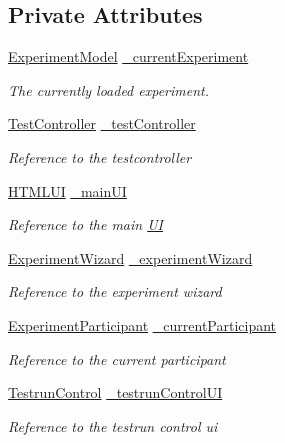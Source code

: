 \subsection*{Private Attributes}
\begin{DoxyCompactItemize}
\item 
\hyperlink{class_web_analyzer_1_1_models_1_1_base_1_1_experiment_model}{Experiment\+Model} \hyperlink{class_web_analyzer_1_1_controller_1_1_main_controller_aa4f1360b63aad914ee646345d48c4837}{\+\_\+current\+Experiment}
\begin{DoxyCompactList}\small\item\em The currently loaded experiment. \end{DoxyCompactList}\item 
\hyperlink{class_web_analyzer_1_1_controller_1_1_test_controller}{Test\+Controller} \hyperlink{class_web_analyzer_1_1_controller_1_1_main_controller_a89f0064ffc8bd59de5df9e610fc765f1}{\+\_\+test\+Controller}
\begin{DoxyCompactList}\small\item\em Reference to the testcontroller \end{DoxyCompactList}\item 
\hyperlink{class_web_analyzer_1_1_u_i_1_1_h_t_m_l_u_i}{H\+T\+M\+L\+U\+I} \hyperlink{class_web_analyzer_1_1_controller_1_1_main_controller_a8f4b51e26bd6810c2103a75a9116c7f6}{\+\_\+main\+U\+I}
\begin{DoxyCompactList}\small\item\em Reference to the main \hyperlink{namespace_web_analyzer_1_1_u_i}{U\+I} \end{DoxyCompactList}\item 
\hyperlink{class_web_analyzer_1_1_u_i_1_1_experiment_wizard}{Experiment\+Wizard} \hyperlink{class_web_analyzer_1_1_controller_1_1_main_controller_a00b3a191e545ae8d10db2400f2b498a1}{\+\_\+experiment\+Wizard}
\begin{DoxyCompactList}\small\item\em Reference to the experiment wizard \end{DoxyCompactList}\item 
\hyperlink{class_web_analyzer_1_1_models_1_1_base_1_1_experiment_participant}{Experiment\+Participant} \hyperlink{class_web_analyzer_1_1_controller_1_1_main_controller_ab952ff62d095db81af55f2676923a87a}{\+\_\+current\+Participant}
\begin{DoxyCompactList}\small\item\em Reference to the current participant \end{DoxyCompactList}\item 
\hyperlink{class_web_analyzer_1_1_u_i_1_1_interaction_objects_1_1_testrun_control}{Testrun\+Control} \hyperlink{class_web_analyzer_1_1_controller_1_1_main_controller_a8acee18d61ec9490f689cf2492c56bc0}{\+\_\+testrun\+Control\+U\+I}
\begin{DoxyCompactList}\small\item\em Reference to the testrun control ui \end{DoxyCompactList}\end{DoxyCompactItemize}


